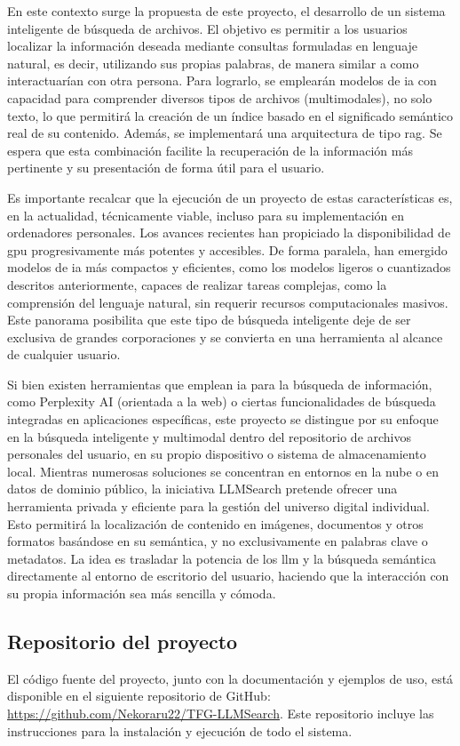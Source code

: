 En este contexto surge la propuesta de este proyecto, el desarrollo de un sistema inteligente de búsqueda de archivos. El objetivo es permitir a los usuarios localizar la información deseada mediante consultas formuladas en lenguaje natural, es decir, utilizando sus propias palabras, de manera similar a como interactuarían con otra persona. Para lograrlo, se emplearán modelos de \gls{ia} con capacidad para comprender diversos tipos de archivos (multimodales), no solo texto, lo que permitirá la creación de un índice basado en el significado semántico real de su contenido. Además, se implementará una arquitectura de tipo \gls{rag}. Se espera que esta combinación facilite la recuperación de la información más pertinente y su presentación de forma útil para el usuario.

Es importante recalcar que la ejecución de un proyecto de estas características es, en la actualidad, técnicamente viable, incluso para su implementación en ordenadores personales. Los avances recientes han propiciado la disponibilidad de \gls{gpu} progresivamente más potentes y accesibles. De forma paralela, han emergido modelos de \gls{ia} más compactos y eficientes, como los modelos ligeros o cuantizados descritos anteriormente, capaces de realizar tareas complejas, como la comprensión del lenguaje natural, sin requerir recursos computacionales masivos. Este panorama posibilita que este tipo de búsqueda inteligente deje de ser exclusiva de grandes corporaciones y se convierta en una herramienta al alcance de cualquier usuario.

Si bien existen herramientas que emplean \gls{ia} para la búsqueda de información, como Perplexity AI (orientada a la web) o ciertas funcionalidades de búsqueda integradas en aplicaciones específicas, este proyecto se distingue por su enfoque en la búsqueda inteligente y multimodal dentro del repositorio de archivos personales del usuario, en su propio dispositivo o sistema de almacenamiento local. Mientras numerosas soluciones se concentran en entornos en la nube o en datos de dominio público, la iniciativa LLMSearch pretende ofrecer una herramienta privada y eficiente para la gestión del universo digital individual. Esto permitirá la localización de contenido en imágenes, documentos y otros formatos basándose en su semántica, y no exclusivamente en palabras clave o metadatos. La idea es trasladar la potencia de los \gls{llm} y la búsqueda semántica directamente al entorno de escritorio del usuario, haciendo que la interacción con su propia información sea más sencilla y cómoda.

\subsection{Repositorio del proyecto}
El código fuente del proyecto, junto con la documentación y ejemplos de uso, está disponible en el siguiente repositorio de GitHub: \url{https://github.com/Nekoraru22/TFG-LLMSearch}. Este repositorio incluye las instrucciones para la instalación y ejecución de todo el sistema.